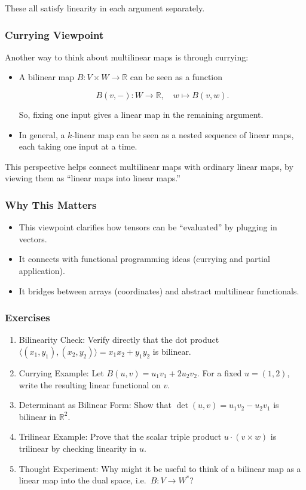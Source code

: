 \documentclass[
  letterpaper,
  DIV=11,
  numbers=noendperiod]{scrreprt}
\providecommand{\tightlist}{%
  \setlength{\itemsep}{0pt}\setlength{\parskip}{0pt}}
\begin{document}
These all satisfy linearity in each argument separately.

\subsubsection{Currying Viewpoint}\label{currying-viewpoint}

Another way to think about multilinear maps is through currying:

\begin{itemize}
\item
  A bilinear map \(B: V \times W \to \mathbb{R}\) can be seen as a
  function

  \[
  B(v,-): W \to \mathbb{R}, \quad w \mapsto B(v,w).
  \]

  So, fixing one input gives a linear map in the remaining argument.
\item
  In general, a \(k\)-linear map can be seen as a nested sequence of
  linear maps, each taking one input at a time.
\end{itemize}

This perspective helps connect multilinear maps with ordinary linear
maps, by viewing them as ``linear maps into linear maps.''

\subsubsection{Why This Matters}\label{why-this-matters-4}

\begin{itemize}
\tightlist
\item
  This viewpoint clarifies how tensors can be ``evaluated'' by plugging
  in vectors.
\item
  It connects with functional programming ideas (currying and partial
  application).
\item
  It bridges between arrays (coordinates) and abstract multilinear
  functionals.
\end{itemize}

\subsubsection{Exercises}\label{exercises-12}

\begin{enumerate}
\def\labelenumi{\arabic{enumi}.}
\item
  Bilinearity Check: Verify directly that the dot product
  \(\langle (x_1,y_1),(x_2,y_2)\rangle = x_1x_2 + y_1y_2\) is bilinear.
\item
  Currying Example: Let \(B(u,v) = u_1v_1 + 2u_2v_2\). For a fixed
  \(u=(1,2)\), write the resulting linear functional on \(v\).
\item
  Determinant as Bilinear Form: Show that
  \(\det(u,v) = u_1v_2 - u_2v_1\) is bilinear in \(\mathbb{R}^2\).
\item
  Trilinear Example: Prove that the scalar triple product
  \(u \cdot (v \times w)\) is trilinear by checking linearity in \(u\).
\item
  Thought Experiment: Why might it be useful to think of a bilinear map
  as a linear map into the dual space, i.e.~\(B: V \to W^*\)?
\end{enumerate}
\end{document}
